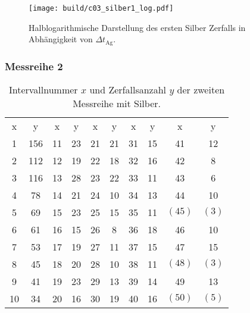 

\begin{figure}[H]
    \centering
    \texttt{[image: build/c03\_silber1\_log.pdf]}
    \caption[]{Halblogarithmische Darstellung des ersten Silber Zerfalls in Abhängigkeit von $\Delta t_\text{Ag}$.}
    \label{fig:silber1_log}
\end{figure}
















\subsubsection{Messreihe 2}

\begin{table}[H]
    \centering
    \caption[short]{Intervallnummer $x$ und Zerfallsanzahl $y$ der zweiten Messreihe mit Silber.}
    \label{tab:silber2}
    \begin{tabular}{S S[table-format=3.0] S S S S S S S S}
        \toprule
        {x} & {y} & {x} & {y} & {x} & {y} & {x} & {y} & {x} & {y} \\
        \cmidrule(lr){1-2} \cmidrule(lr){3-4} \cmidrule(lr){5-6} \cmidrule(lr){7-8} \cmidrule(lr){9-10}
        1 & 156 & 11 & 23 & 21 & 21 & 31 & 15 & 41 & 12 \\
        2 & 112 & 12 & 19 & 22 & 18 & 32 & 16 & 42 &  8 \\
        3 & 116 & 13 & 28 & 23 & 22 & 33 & 11 & 43 &  6 \\
        4 &  78 & 14 & 21 & 24 & 10 & 34 & 13 & 44 & 10 \\
        5 &  69 & 15 & 23 & 25 & 15 & 35 & 11 & {$(45)$} &  {$(3)$} \\
        6 &  61 & 16 & 15 & 26 &  8 & 36 & 18 & 46 & 10 \\
        7 &  53 & 17 & 19 & 27 & 11 & 37 & 15 & 47 & 15 \\
        8 &  45 & 18 & 20 & 28 & 10 & 38 & 11 & {$(48)$} &  {$(3)$} \\
        9 &  41 & 19 & 23 & 29 & 13 & 39 & 14 & 49 & 13 \\
       10 &  34 & 20 & 16 & 30 & 19 & 40 & 16 & {$(50)$} &  {$(5)$} \\
        \bottomrule
    \end{tabular}
\end{table}
